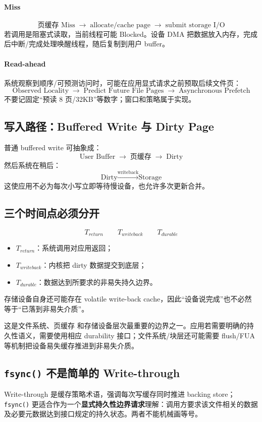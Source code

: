 \documentclass[11pt,a4paper]{ctexart}
\newcommand{\kw}[1]{\textbf{#1}}
\newcommand{\code}[1]{\texttt{#1}}
\newcommand{\arr}{\;\longrightarrow\;}
\begin{document}
\paragraph{Miss}
\[
\text{页缓存 Miss}\arr\text{allocate/cache page}\arr\text{submit storage I/O}
\]
若调用是阻塞式读取，当前线程可能 Blocked。设备 DMA 把数据放入内存，完成后中断/完成处理唤醒线程，随后复制到用户 buffer。

\paragraph{Read-ahead}
系统观察到顺序/可预测访问时，可能在应用显式请求之前预取后续文件页：
\[
\boxed{\text{Observed Locality}\arr\text{Predict Future File Pages}\arr\text{Asynchronous Prefetch}}
\]
不要记固定“预读 8 页/32KB”等数字；窗口和策略属于实现。

\subsection{写入路径：Buffered Write 与 Dirty Page}
普通 buffered write 可抽象成：
\[
\text{User Buffer}\arr\text{页缓存}\arr\text{Dirty}
\]
然后系统在稍后：
\[
\text{Dirty}\xrightarrow{\text{writeback}}\text{Storage}
\]
这使应用不必为每次小写立即等待慢设备，也允许多次更新合并。

\subsection{三个时间点必须分开}
\[
\boxed{T_{return}}
\qquad
\boxed{T_{writeback}}
\qquad
\boxed{T_{durable}}
\]
\begin{itemize}
  \item $T_{return}$：系统调用对应用返回；
  \item $T_{writeback}$：内核把 dirty 数据提交到底层；
  \item $T_{durable}$：数据达到所要求的非易失持久边界。
\end{itemize}
存储设备自身还可能存在 volatile write-back cache，因此“设备说完成”也不必然等于“已落到非易失介质”。

\begin{warn}[\code{write()} 成功返回不等于持久化完成]
这是文件系统、页缓存 和存储设备层次最重要的边界之一。应用若需要明确的持久性语义，需要使用相应 durability 接口；文件系统/块层还可能需要 flush/FUA 等机制把设备易失缓存推进到非易失介质。
\end{warn}

\subsection{\code{fsync()} 不是简单的 Write-through}
Write-through 是缓存策略术语，强调每次写缓存同时推进 backing store；\code{fsync()} 更适合作为一个\kw{显式持久性边界请求}理解：调用方要求该文件相关的数据及必要元数据达到接口规定的持久状态。两者不能机械画等号。
\end{document}
